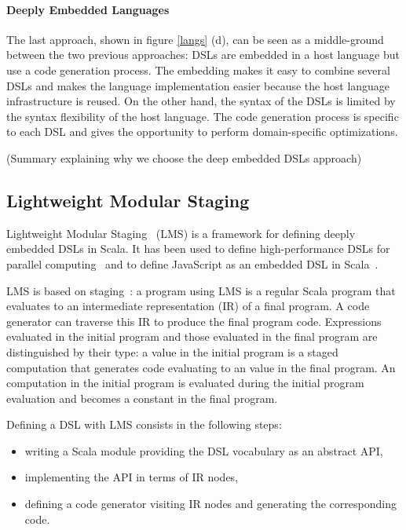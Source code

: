 \documentclass[preprint]{sigplanconf}
\begin{document}
\paragraph{Deeply Embedded Languages}

The last approach, shown in figure \ref{langs} (d), can be seen as a middle-ground between the two previous
approaches: DSLs are embedded in a host language but use a code generation process. The embedding makes it easy to
combine several DSLs and makes the language implementation easier because the host language infrastructure is
reused. On the other hand, the syntax of the DSLs is limited by the syntax flexibility of the host language. The code
generation process is specific to each DSL and gives the opportunity to perform domain-specific optimizations.

(Summary explaining why we choose the deep embedded DSLs approach)

\subsection{Lightweight Modular Staging}

Lightweight Modular Staging~\cite{Rompf12_LMSThesis, Rompf12_LMS} (LMS) is a framework for defining deeply embedded
DSLs in Scala. It has been used to define high-performance DSLs for parallel computing~\cite{Brown11_Parallel} and to
define JavaScript as an embedded DSL in Scala~\cite{Kossakowski12_JsDESL}.

LMS is based on staging~\cite{Jorring1986_Staging}: a program using LMS is a regular Scala program that evaluates
to an intermediate representation (IR) of a final program. A code generator can traverse this IR to produce the final
program code. Expressions evaluated in the initial program and those evaluated in the final program are distinguished
by their type: a  value in the initial program is a staged computation that generates code evaluating
to an  value in the final program. An  computation in the initial program is evaluated during the
initial program evaluation and becomes a constant in the final program.

Defining a DSL with LMS consists in the following steps:

\begin{itemize}
 \item writing a Scala module providing the DSL vocabulary as an abstract API,
 \item implementing the API in terms of IR nodes,
 \item defining a code generator visiting IR nodes and generating the corresponding code.
\end{itemize}
\end{document}
